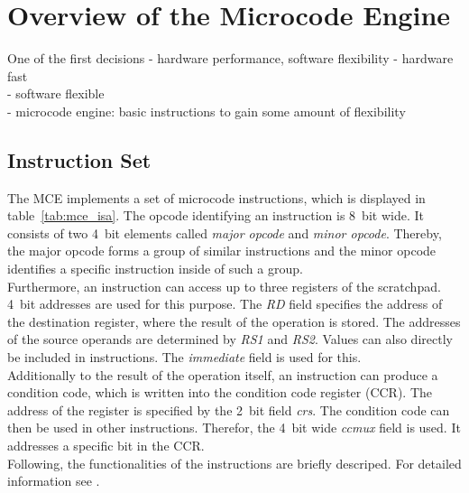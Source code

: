 \section{Overview of the Microcode Engine}

One of the first decisions
- hardware performance, software flexibility \cite{}
- hardware fast\\
- software flexible\\
- microcode engine: basic instructions to gain some amount of flexibility\\

\subsection{Instruction Set}

The MCE implements a set of microcode instructions, which is displayed in table~\ref{tab:mce_isa}.
The opcode identifying an instruction is 8~bit wide.
It consists of two 4~bit elements called \emph{major opcode} and \emph{minor opcode}.
Thereby, the major opcode forms a group of similar instructions and the minor opcode identifies a specific instruction inside of such a group.\\
Furthermore, an instruction can access up to three registers of the scratchpad.
4~bit addresses are used for this purpose.
The \emph{RD} field specifies the address of the destination register, where the result of the operation is stored.
The addresses of the source operands are determined by \emph{RS1} and \emph{RS2}.
Values can also directly be included in instructions.
The \emph{immediate} field is used for this.\\
Additionally to the result of the operation itself, an instruction can produce a condition code, which is written into the condition code register (CCR).
The address of the register is specified by the 2~bit field \emph{crs}.
The condition code can then be used in other instructions.
Therefor, the 4~bit wide \emph{ccmux} field is used.
It addresses a specific bit in the CCR.\\
Following, the functionalities of the instructions are briefly descriped. For detailed information see \cite{mce}.\\

